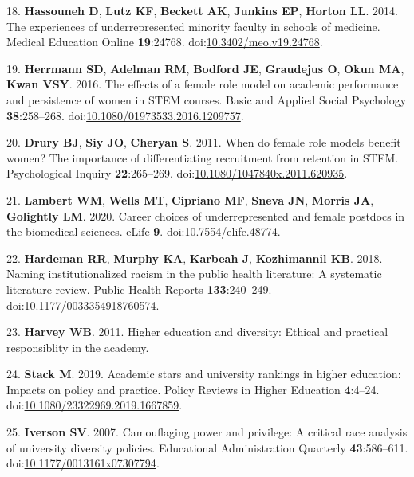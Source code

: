 \documentclass[10pt,]{article}
\begin{document}
\hypertarget{ref-hassouneh_experiences_2014}{}
18. \textbf{Hassouneh D}, \textbf{Lutz KF}, \textbf{Beckett AK},
\textbf{Junkins EP}, \textbf{Horton LL}. 2014. The experiences of
underrepresented minority faculty in schools of medicine. Medical
Education Online \textbf{19}:24768.
doi:\href{https://doi.org/10.3402/meo.v19.24768}{10.3402/meo.v19.24768}.

\hypertarget{ref-Herrmann2016}{}
19. \textbf{Herrmann SD}, \textbf{Adelman RM}, \textbf{Bodford JE},
\textbf{Graudejus O}, \textbf{Okun MA}, \textbf{Kwan VSY}. 2016. The
effects of a female role model on academic performance and persistence
of women in STEM courses. Basic and Applied Social Psychology
\textbf{38}:258--268.
doi:\href{https://doi.org/10.1080/01973533.2016.1209757}{10.1080/01973533.2016.1209757}.

\hypertarget{ref-Drury2011}{}
20. \textbf{Drury BJ}, \textbf{Siy JO}, \textbf{Cheryan S}. 2011. When
do female role models benefit women? The importance of differentiating
recruitment from retention in STEM. Psychological Inquiry
\textbf{22}:265--269.
doi:\href{https://doi.org/10.1080/1047840x.2011.620935}{10.1080/1047840x.2011.620935}.

\hypertarget{ref-Lambert2020}{}
21. \textbf{Lambert WM}, \textbf{Wells MT}, \textbf{Cipriano MF},
\textbf{Sneva JN}, \textbf{Morris JA}, \textbf{Golightly LM}. 2020.
Career choices of underrepresented and female postdocs in the biomedical
sciences. eLife \textbf{9}.
doi:\href{https://doi.org/10.7554/elife.48774}{10.7554/elife.48774}.

\hypertarget{ref-Hardeman2018}{}
22. \textbf{Hardeman RR}, \textbf{Murphy KA}, \textbf{Karbeah J},
\textbf{Kozhimannil KB}. 2018. Naming institutionalized racism in the
public health literature: A systematic literature review. Public Health
Reports \textbf{133}:240--249.
doi:\href{https://doi.org/10.1177/0033354918760574}{10.1177/0033354918760574}.

\hypertarget{ref-harvey_diversity_2011}{}
23. \textbf{Harvey WB}. 2011. Higher education and diversity: Ethical
and practical responsiblity in the academy.

\hypertarget{ref-Stack2019}{}
24. \textbf{Stack M}. 2019. Academic stars and university rankings in
higher education: Impacts on policy and practice. Policy Reviews in
Higher Education \textbf{4}:4--24.
doi:\href{https://doi.org/10.1080/23322969.2019.1667859}{10.1080/23322969.2019.1667859}.

\hypertarget{ref-Iverson2007}{}
25. \textbf{Iverson SV}. 2007. Camouflaging power and privilege: A
critical race analysis of university diversity policies. Educational
Administration Quarterly \textbf{43}:586--611.
doi:\href{https://doi.org/10.1177/0013161x07307794}{10.1177/0013161x07307794}.
\end{document}
